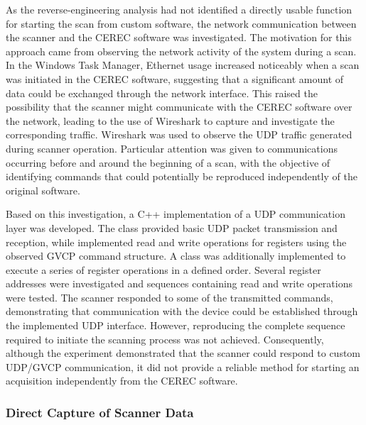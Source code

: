 As the reverse-engineering analysis had not identified a directly usable function for starting the scan from custom software, the network communication between the scanner and the CEREC software was investigated. The motivation for this approach came from observing the network activity of the system during a scan. In the Windows Task Manager, Ethernet usage increased noticeably when a scan was initiated in the CEREC software, suggesting that a significant amount of data could be exchanged through the network interface. This raised the possibility that the scanner might communicate with the CEREC software over the network, leading to the use of Wireshark to capture and investigate the corresponding traffic. Wireshark was used to observe the UDP traffic generated during scanner operation. Particular attention was given to communications occurring before and around the beginning of a scan, with the objective of identifying commands that could potentially be reproduced independently of the original software.

Based on this investigation, a C++ implementation of a UDP communication layer was developed. The  class provided basic UDP packet transmission and reception, while  implemented read and write operations for registers using the observed GVCP command structure. A  class was additionally implemented to execute a series of register operations in a defined order.
Several register addresses were investigated and sequences containing read and write operations were tested. The scanner responded to some of the transmitted commands, demonstrating that communication with the device could be established through the implemented UDP interface. However, reproducing the complete sequence required to initiate the scanning process was not achieved. Consequently, although the experiment demonstrated that the scanner could respond to custom UDP/GVCP communication, it did not provide a reliable method for starting an acquisition independently from the CEREC software.

\subsubsection{Direct Capture of Scanner Data}

